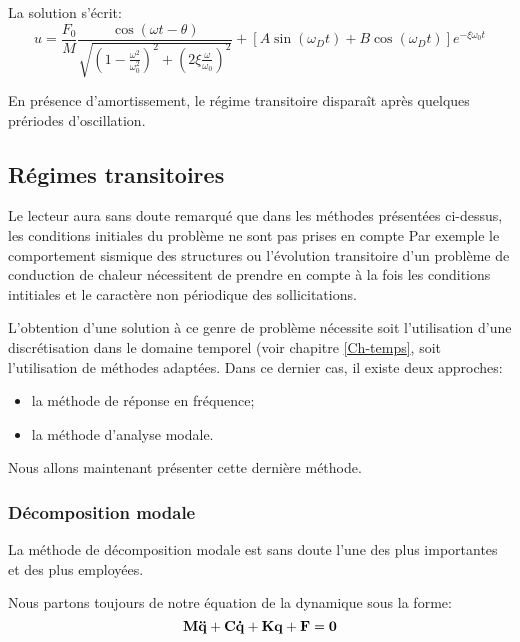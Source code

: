La solution s'écrit:
\begin{equation}
u = \dfrac{F_0}M\dfrac{\cos(\omega t-\theta)}{\sqrt{\left(1-\frac{\omega^2}{\omega_0^2}\right)^2+\left(2\xi\frac{\omega}{\omega_0}\right)^2}}
+\left[A\sin (\omega_D t)+B\cos(\omega_D t)\right] e^{-\xi\omega_0 t}
\end{equation}

\medskip
En présence d'amortissement, le régime transitoire disparaît après quelques prériodes d'oscillation.






\medskip{}
\subsection{Régimes transitoires}\label{Sec-RT}

Le lecteur aura sans doute remarqué que dans les méthodes présentées ci-dessus, 
les conditions initiales du problème ne sont pas prises en compte
Par exemple le comportement sismique des structures ou l'évolution transitoire d'un problème
de conduction de chaleur nécessitent de prendre en compte à la fois les conditions
intitiales et le caractère non périodique des sollicitations.

L'obtention d'une solution à ce genre de problème nécessite soit l'utilisation d'une discrétisation 
dans le domaine temporel (voir chapitre \ref{Ch-temps}, soit l'utilisation de méthodes adaptées. 
Dans ce dernier cas, il existe deux approches:
\begin{itemize}
   \item la méthode de réponse en fréquence;
   \item la méthode d'analyse modale.
\end{itemize}
Nous allons maintenant présenter cette dernière méthode.

\medskip
\subsubsection{Décomposition modale}

La méthode de décomposition modale est sans doute l'une des plus importantes et des plus
employées.

\medskip
Nous partons toujours de notre équation de la dynamique sous la forme:
\begin{equation} \mathbf{M}\mathbf{\ddot{q}}+\mathbf{C}\mathbf{\dot{q}}+\mathbf{K}\mathbf{q}+\mathbf{F} = \mathbf{0} \end{equation}

